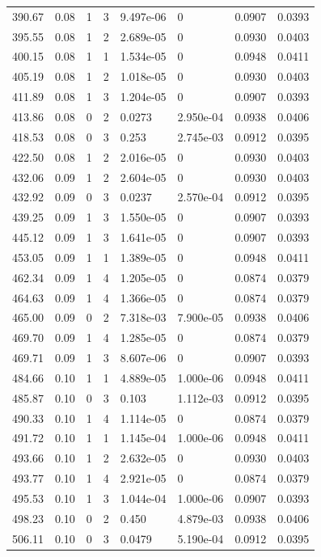 \documentclass[preview]{standalone}
\begin{document}
{{{\begin{tabular}{L{1.2cm}C{1.2cm} C{0.3cm}C{0.5cm} C{1.4cm}C{1.4cm} C{1.4cm}C{1.4cm}}
  390.67  &  0.08  & 1     &  3 &  9.497e-06  & 0  & 0.0907 &  0.0393   \\ 
  395.55  &  0.08  & 1     &  2 &  2.689e-05  & 0  & 0.0930 &  0.0403   \\ 
  400.15  &  0.08  & 1     &  1 &  1.534e-05  & 0  & 0.0948 &  0.0411   \\ 
  405.19  &  0.08  & 1     &  2 &  1.018e-05  & 0  & 0.0930 &  0.0403   \\ 
  411.89  &  0.08  & 1     &  3 &  1.204e-05  & 0  & 0.0907 &  0.0393   \\ 
  413.86  &  0.08  & 0     &  2 &  0.0273  & 2.950e-04  & 0.0938 &  0.0406   \\ 
  418.53  &  0.08  & 0     &  3 &  0.253  & 2.745e-03  & 0.0912 &  0.0395   \\ 
  422.50  &  0.08  & 1     &  2 &  2.016e-05  & 0  & 0.0930 &  0.0403   \\ 
  432.06  &  0.09  & 1     &  2 &  2.604e-05  & 0  & 0.0930 &  0.0403   \\ 
  432.92  &  0.09  & 0     &  3 &  0.0237  & 2.570e-04  & 0.0912 &  0.0395   \\ 
  439.25  &  0.09  & 1     &  3 &  1.550e-05  & 0  & 0.0907 &  0.0393   \\ 
  445.12  &  0.09  & 1     &  3 &  1.641e-05  & 0  & 0.0907 &  0.0393   \\ 
  453.05  &  0.09  & 1     &  1 &  1.389e-05  & 0  & 0.0948 &  0.0411   \\ 
  462.34  &  0.09  & 1     &  4 &  1.205e-05  & 0  & 0.0874 &  0.0379   \\ 
  464.63  &  0.09  & 1     &  4 &  1.366e-05  & 0  & 0.0874 &  0.0379   \\ 
  465.00  &  0.09  & 0     &  2 &  7.318e-03  & 7.900e-05  & 0.0938 &  0.0406   \\ 
  469.70  &  0.09  & 1     &  4 &  1.285e-05  & 0  & 0.0874 &  0.0379   \\ 
  469.71  &  0.09  & 1     &  3 &  8.607e-06  & 0  & 0.0907 &  0.0393   \\ 
  484.66  &  0.10  & 1     &  1 &  4.889e-05  & 1.000e-06  & 0.0948 &  0.0411   \\ 
  485.87  &  0.10  & 0     &  3 &  0.103  & 1.112e-03  & 0.0912 &  0.0395   \\ 
  490.33  &  0.10  & 1     &  4 &  1.114e-05  & 0  & 0.0874 &  0.0379   \\ 
  491.72  &  0.10  & 1     &  1 &  1.145e-04  & 1.000e-06  & 0.0948 &  0.0411   \\ 
  493.66  &  0.10  & 1     &  2 &  2.632e-05  & 0  & 0.0930 &  0.0403   \\ 
  493.77  &  0.10  & 1     &  4 &  2.921e-05  & 0  & 0.0874 &  0.0379   \\ 
  495.53  &  0.10  & 1     &  3 &  1.044e-04  & 1.000e-06  & 0.0907 &  0.0393   \\ 
  498.23  &  0.10  & 0     &  2 &  0.450  & 4.879e-03  & 0.0938 &  0.0406   \\ 
  506.11  &  0.10  & 0     &  3 &  0.0479  & 5.190e-04  & 0.0912 &  0.0395   \\ 
\hline 
\end{tabular} 

}}}
\end{document}
